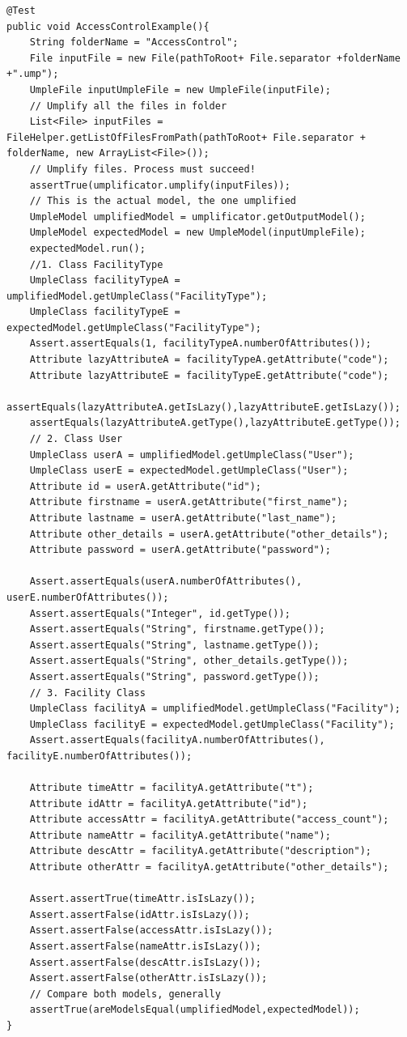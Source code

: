 \begin{lstlisting}[style=umpleOut,label={lst:acsExample},caption=Unit test to assert the Access Control Example.]
@Test
public void AccessControlExample(){
	String folderName = "AccessControl";
	File inputFile = new File(pathToRoot+ File.separator +folderName +".ump");
	UmpleFile inputUmpleFile = new UmpleFile(inputFile);
	// Umplify all the files in folder
	List<File> inputFiles = FileHelper.getListOfFilesFromPath(pathToRoot+ File.separator + folderName, new ArrayList<File>());
	// Umplify files. Process must succeed!
	assertTrue(umplificator.umplify(inputFiles));
	// This is the actual model, the one umplified 
	UmpleModel umplifiedModel = umplificator.getOutputModel();
	UmpleModel expectedModel = new UmpleModel(inputUmpleFile);
	expectedModel.run();		
	//1. Class FacilityType
	UmpleClass facilityTypeA = umplifiedModel.getUmpleClass("FacilityType");
	UmpleClass facilityTypeE = expectedModel.getUmpleClass("FacilityType");		
	Assert.assertEquals(1, facilityTypeA.numberOfAttributes());
	Attribute lazyAttributeA = facilityTypeA.getAttribute("code");
	Attribute lazyAttributeE = facilityTypeE.getAttribute("code");	
	assertEquals(lazyAttributeA.getIsLazy(),lazyAttributeE.getIsLazy());
	assertEquals(lazyAttributeA.getType(),lazyAttributeE.getType());		
	// 2. Class User
	UmpleClass userA = umplifiedModel.getUmpleClass("User");
	UmpleClass userE = expectedModel.getUmpleClass("User");	
	Attribute id = userA.getAttribute("id");
	Attribute firstname = userA.getAttribute("first_name");
	Attribute lastname = userA.getAttribute("last_name");
	Attribute other_details = userA.getAttribute("other_details");
	Attribute password = userA.getAttribute("password");
			
	Assert.assertEquals(userA.numberOfAttributes(), userE.numberOfAttributes());
	Assert.assertEquals("Integer", id.getType());
	Assert.assertEquals("String", firstname.getType());
	Assert.assertEquals("String", lastname.getType());
	Assert.assertEquals("String", other_details.getType());
	Assert.assertEquals("String", password.getType());
	// 3. Facility Class
	UmpleClass facilityA = umplifiedModel.getUmpleClass("Facility");
	UmpleClass facilityE = expectedModel.getUmpleClass("Facility");
	Assert.assertEquals(facilityA.numberOfAttributes(), facilityE.numberOfAttributes());
	
	Attribute timeAttr = facilityA.getAttribute("t");
	Attribute idAttr = facilityA.getAttribute("id");
	Attribute accessAttr = facilityA.getAttribute("access_count");
	Attribute nameAttr = facilityA.getAttribute("name");
	Attribute descAttr = facilityA.getAttribute("description");
	Attribute otherAttr = facilityA.getAttribute("other_details");
			
	Assert.assertTrue(timeAttr.isIsLazy());
	Assert.assertFalse(idAttr.isIsLazy());
	Assert.assertFalse(accessAttr.isIsLazy());
	Assert.assertFalse(nameAttr.isIsLazy());
	Assert.assertFalse(descAttr.isIsLazy());
	Assert.assertFalse(otherAttr.isIsLazy());
	// Compare both models, generally
	assertTrue(areModelsEqual(umplifiedModel,expectedModel));
}
\end{lstlisting}

